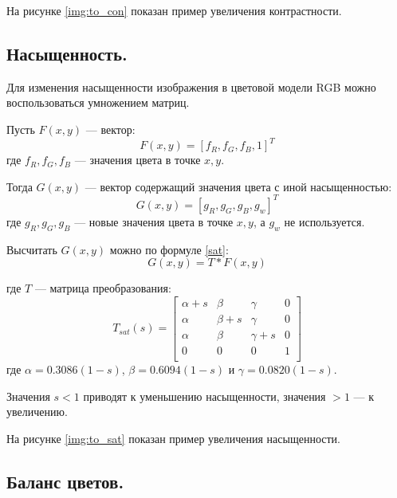 На рисунке \ref{img:to_con} показан пример увеличения контрастности.


\subsection{Насыщенность.}

Для изменения насыщенности изображения в цветовой модели RGB можно воспользоваться умножением матриц.

Пусть $F(x,y)$ --- вектор:
\begin{equation}
	\label{F}
	F(x,y) = [f_R, f_G, f_B, 1]^T
\end{equation}
где $f_R, f_G, f_B$ --- значения цвета в точке $x,y$.

Тогда $G(x,y)$ --- вектор содержащий значения цвета с иной насыщенностью:
\begin{equation}
	\label{G}
	G(x,y) = [g_R, g_G, g_B, g_w]^T
\end{equation}
где $g_R, g_G, g_B$ --- новые значения цвета в точке $x,y$, а $g_w$ не используется.

Высчитать $G(x,y)$ можно по формуле \ref{sat}:
\begin{equation}
	\label{sat}
	G(x,y) = T * F(x,y)
\end{equation}

где $T$ --- матрица преобразования:
\begin{equation}
	\label{tsat}
	T_{sat}(s) = \begin{bmatrix}
					\alpha + s & \beta & \gamma & 0\\
				    \alpha & \beta + s & \gamma & 0 \\ 
					\alpha & \beta & \gamma + s & 0 \\ 
					0 & 0 & 0 & 1 \\ 
				\end{bmatrix}
\end{equation}
где $\alpha = 0.3086(1 - s)$, $\beta = 0.6094(1 - s)$ и $\gamma = 0.0820(1 - s)$.

Значения $s < 1$ приводят к уменьшению насыщенности, значения $> 1$ --- к увеличению. \cite{sat}

На рисунке \ref{img:to_sat} показан пример увеличения насыщенности.


\subsection{Баланс цветов.}


